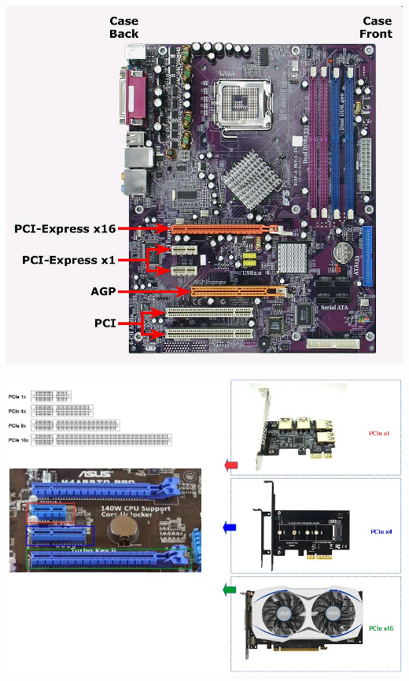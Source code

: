 \documentclass[aspectratio=43]{beamer}
\begin{document}
\begin{frame}{}
	 
	\begin{center}
		\includegraphics[width=0.8\linewidth]{extrahovane_obrazky/img_2_page12_0.jpeg}
	\end{center}
	
\end{frame}

\begin{frame}{}
	 
	\begin{center}
		\includegraphics[width=1\linewidth]{extrahovane_obrazky/img_2_page14_0.jpeg}
	\end{center}
	
\end{frame}
\end{document}
